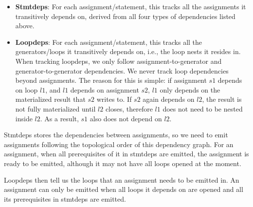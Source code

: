 \documentclass[sigplan, nonacm]{acmart}\settopmatter{printfolios=true,printccs=false,printacmref=false}
\begin{document}
\begin{itemize}
\item \textbf{Stmtdeps}: For each assignment/statement, this tracks all the assignments it transitively depends on, derived from all four types of dependencies listed above.
\item \textbf{Loopdeps}: For each assignment/statement, this tracks all the generators/loops it transitively depends on, i.e., the loop nests it resides in. When tracking loopdeps, we only follow assignment-to-generator and generator-to-generator dependencies. We never track loop dependencies beyond assignments. The reason for this is simple: if assignment $s1$ depends on loop $l1$, and $l1$ depends on assignment $s2$, $l1$ only depends on the materialized result that $s2$ writes to. If $s2$ again depends on $l2$, the result is not fully materialized until $l2$ closes, therefore $l1$ does not need to be nested inside $l2$. As a result, $s1$ also does not depend on $l2$.
\end{itemize}

Stmtdeps stores the dependencies between assignments, so we need to emit assignments following the topological order of this dependency graph. For an assignment, when all prerequisites of it in stmtdeps are emitted, the assignment is ready to be emitted, although it may not have all loops opened at the moment.\par

Loopdeps then tell us the loops that an assignment needs to be emitted in. An assignment can only be emitted when all loops it depends on are opened and all its prerequisites in stmtdeps are emitted.\par
\end{document}
